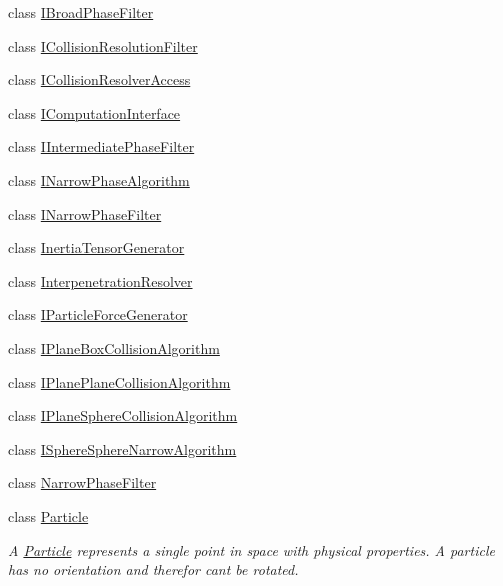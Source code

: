 \begin{DoxyCompactItemize}
\item 
class \mbox{\hyperlink{classr3_1_1_i_broad_phase_filter}{I\+Broad\+Phase\+Filter}}
\item 
class \mbox{\hyperlink{classr3_1_1_i_collision_resolution_filter}{I\+Collision\+Resolution\+Filter}}
\item 
class \mbox{\hyperlink{classr3_1_1_i_collision_resolver_access}{I\+Collision\+Resolver\+Access}}
\item 
class \mbox{\hyperlink{classr3_1_1_i_computation_interface}{I\+Computation\+Interface}}
\item 
class \mbox{\hyperlink{classr3_1_1_i_intermediate_phase_filter}{I\+Intermediate\+Phase\+Filter}}
\item 
class \mbox{\hyperlink{classr3_1_1_i_narrow_phase_algorithm}{I\+Narrow\+Phase\+Algorithm}}
\item 
class \mbox{\hyperlink{classr3_1_1_i_narrow_phase_filter}{I\+Narrow\+Phase\+Filter}}
\item 
class \mbox{\hyperlink{classr3_1_1_inertia_tensor_generator}{Inertia\+Tensor\+Generator}}
\item 
class \mbox{\hyperlink{classr3_1_1_interpenetration_resolver}{Interpenetration\+Resolver}}
\item 
class \mbox{\hyperlink{classr3_1_1_i_particle_force_generator}{I\+Particle\+Force\+Generator}}
\item 
class \mbox{\hyperlink{classr3_1_1_i_plane_box_collision_algorithm}{I\+Plane\+Box\+Collision\+Algorithm}}
\item 
class \mbox{\hyperlink{classr3_1_1_i_plane_plane_collision_algorithm}{I\+Plane\+Plane\+Collision\+Algorithm}}
\item 
class \mbox{\hyperlink{classr3_1_1_i_plane_sphere_collision_algorithm}{I\+Plane\+Sphere\+Collision\+Algorithm}}
\item 
class \mbox{\hyperlink{classr3_1_1_i_sphere_sphere_narrow_algorithm}{I\+Sphere\+Sphere\+Narrow\+Algorithm}}
\item 
class \mbox{\hyperlink{classr3_1_1_narrow_phase_filter}{Narrow\+Phase\+Filter}}
\item 
class \mbox{\hyperlink{classr3_1_1_particle}{Particle}}
\begin{DoxyCompactList}\small\item\em A \mbox{\hyperlink{classr3_1_1_particle}{Particle}} represents a single point in space with physical properties. A particle has no orientation and therefor can\textquotesingle{}t be rotated. \end{DoxyCompactList}\item 

\end{DoxyCompactItemize}
